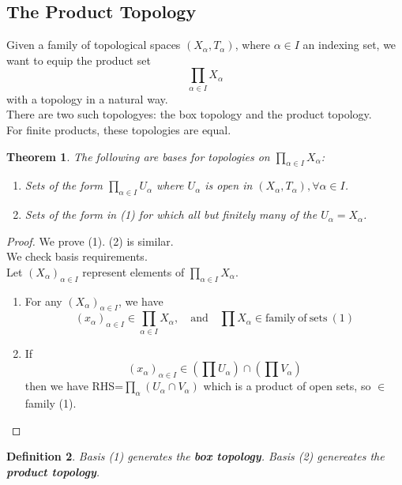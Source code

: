\documentclass{article}
\newtheorem{stheorem}{Theorem}[theorem]
\newtheorem{sdefinition}[stheorem]{Definition}
\theoremstyle{remark}
\theoremstyle{example}
\theoremstyle{examples}
\begin{document}
	\subsection{The Product Topology}
	Given a family of topological spaces $(X_\alpha,T_\alpha)$, where $\alpha \in I$ an indexing set, we want to equip the product set \[ \prod_{\alpha \in I} X_\alpha \] with a topology in a natural way.\\
	There are two such topologyes: the box topology and the product topology.\\
	For finite products, these topologies are equal.
	
	\setcounter{theorem}{2}
	\setcounter{stheorem}{0}
	\begin{stheorem}
		\label{producttopbases}
		The following are bases for topologies on $\prod_{\alpha \in I} X_\alpha$:\begin{enumerate}
			\item Sets of the form $\prod_{\alpha \in I} U_\alpha$ where $U_\alpha$ is open in $(X_\alpha,T_\alpha), \forall \alpha \in I$.
			\item Sets of the form in (1) for which all but finitely many of the $U_\alpha=X_\alpha$.
		\end{enumerate}
	\end{stheorem}
	\begin{proof}
		We prove (1). (2) is similar.\\
		We check basis requirements.\\
		Let $(X_\alpha)_{\alpha \in I}$ represent elements of $\prod_{\alpha \in I} X_\alpha$.
		\begin{enumerate}
			\item For any $(X_\alpha)_{\alpha \in I}$, we have \[\left(x_\alpha\right)_{\alpha \in I} \in \prod_{\alpha \in I} X_\alpha,\quad \mathrm{and}\quad \prod X_\alpha \in \mathrm{family\ of\ sets\ (1)}\]
			\item If \[ \left(x_\alpha\right)_{\alpha \in I} \in \left( \prod U_\alpha \right) \cap \left(\prod V_\alpha \right) \] then we have RHS=$\prod_{\alpha}\left(U_\alpha \cap V_\alpha\right)$ which is a product of open sets, so $\in $ family (1).\\
			
		\end{enumerate}
	\end{proof}

	\begin{sdefinition}
		Basis (1) generates the \textbf{box topology}. Basis (2) genereates the \textbf{product topology}.
	\end{sdefinition}
\end{document}
